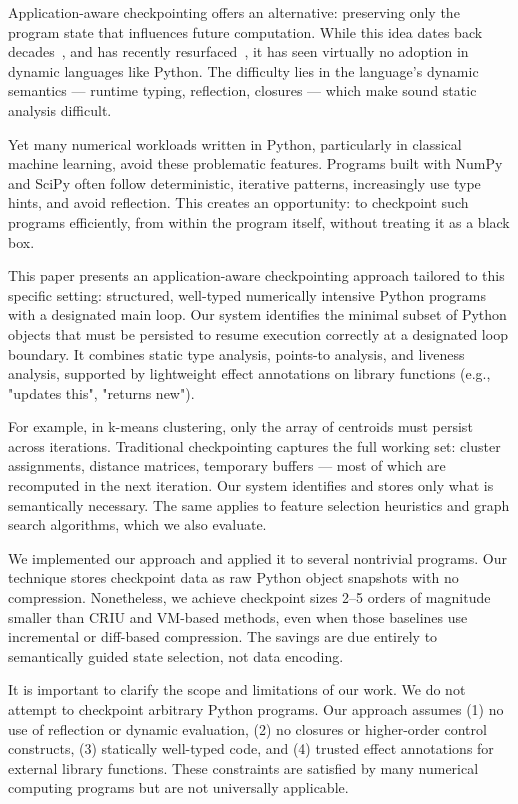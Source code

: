 Application-aware checkpointing offers an alternative: preserving only the program state that influences future computation. While this idea dates back decades~\cite{li1990catch}, and has recently resurfaced~\cite{kim2024lact}, it has seen virtually no adoption in dynamic languages like Python. The difficulty lies in the language’s dynamic semantics --- runtime typing, reflection, closures --- which make sound static analysis difficult.

Yet many numerical workloads written in Python, particularly in classical machine learning, avoid these problematic features. Programs built with NumPy and SciPy often follow deterministic, iterative patterns, increasingly use type hints, and avoid reflection. This creates an opportunity: to checkpoint such programs efficiently, from within the program itself, without treating it as a black box.

This paper presents an application-aware checkpointing approach tailored to this specific setting: structured, well-typed numerically intensive Python programs with a designated main loop. Our system identifies the minimal subset of Python objects that must be persisted to resume execution correctly at a designated loop boundary. It combines static type analysis, points-to analysis, and liveness analysis, supported by lightweight effect annotations on library functions (e.g., "updates this", "returns new").

For example, in k-means clustering, only the array of centroids must persist across iterations. Traditional checkpointing captures the full working set: cluster assignments, distance matrices, temporary buffers --- most of which are recomputed in the next iteration. Our system identifies and stores only what is semantically necessary. The same applies to feature selection heuristics and graph search algorithms, which we also evaluate.

We implemented our approach and applied it to several nontrivial programs. Our technique stores checkpoint data as raw Python object snapshots with no compression. Nonetheless, we achieve checkpoint sizes 2--5 orders of magnitude smaller than CRIU and VM-based methods, even when those baselines use incremental or diff-based compression. The savings are due entirely to semantically guided state selection, not data encoding.

It is important to clarify the scope and limitations of our work. We do not attempt to checkpoint arbitrary Python programs. Our approach assumes (1) no use of reflection or dynamic evaluation, (2) no closures or higher-order control constructs, (3) statically well-typed code, and (4) trusted effect annotations for external library functions. These constraints are satisfied by many numerical computing programs but are not universally applicable.

